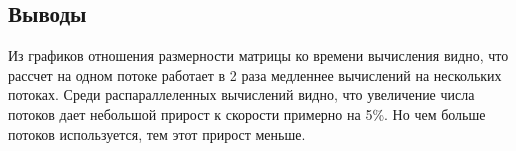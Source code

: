 \subsection*{Выводы}

Из графиков отношения размерности матрицы ко времени вычисления видно, что рассчет на одном потоке работает в 2 раза медленнее вычислений на нескольких потоках. Среди распараллеленных вычислений видно, что увеличение числа потоков дает небольшой прирост к скорости примерно на 5\%. Но чем больше потоков используется, тем
этот прирост меньше.
